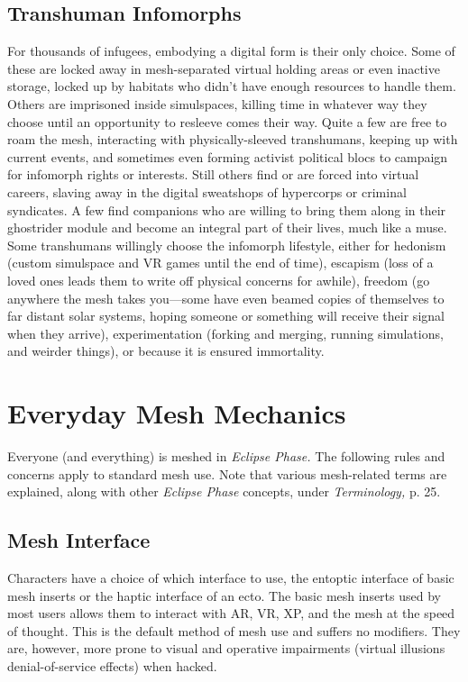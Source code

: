 \subsection{Transhuman Infomorphs}

For thousands of infugees, embodying a digital form 
is their only choice. Some of these are locked away 
in mesh-separated virtual holding areas or even inactive
storage, locked up by habitats who didn't have
enough resources to handle them. Others are imprisoned
inside simulspaces, killing time in whatever way
they choose until an opportunity to resleeve comes 
their way. Quite a few are free to roam the mesh, interacting
with physically-sleeved transhumans, keeping
up with current events, and sometimes even forming
activist political blocs to campaign for infomorph
rights or interests. Still others find or are forced into 
virtual careers, slaving away in the digital sweatshops 
of hypercorps or criminal syndicates. A few find companions
who are willing to bring them along in their
ghostrider module and become an integral part of 
their lives, much like a muse.
Some transhumans willingly choose the infomorph 
lifestyle, either for hedonism (custom simulspace and 
VR games until the end of time), escapism (loss of a 
loved ones leads them to write off physical concerns 
for awhile), freedom (go anywhere the mesh takes 
you—some have even beamed copies of themselves to 
far distant solar systems, hoping someone or something 
will receive their signal when they arrive), experimentation
(forking and merging, running simulations, and
weirder things), or because it is ensured immortality.

\section{Everyday Mesh Mechanics}

Everyone (and everything) is meshed in \textit{Eclipse Phase. }
The following rules and concerns apply to standard 
mesh use. Note that various mesh-related terms are 
explained, along with other \textit{Eclipse Phase }concepts, 
under \textit{Terminology,} p. 25.

\subsection{Mesh Interface}

Characters have a choice of which interface to use, the 
entoptic interface of basic mesh inserts or the haptic 
interface of an ecto.
The basic mesh inserts used by most users allows 
them to interact with AR, VR, XP, and the mesh at the 
speed of thought. This is the default method of mesh 
use and suffers no modifiers. They are, however, more 
prone to visual and operative impairments (virtual illusions
denial-of-service effects) when hacked.

